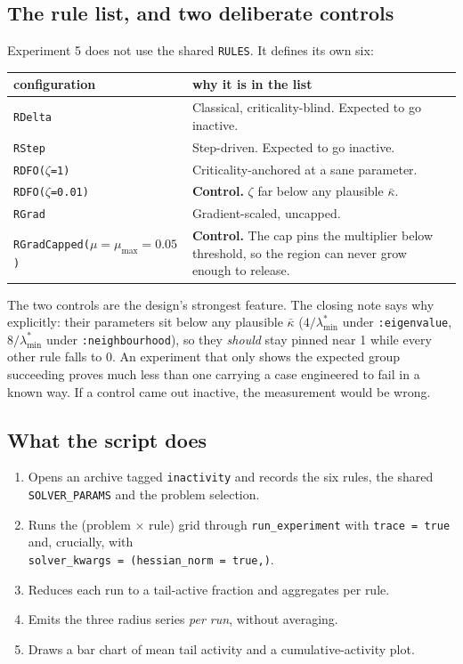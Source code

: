 \documentclass[11pt,a4paper]{article}
\newcommand{\jl}[1]{\texttt{\small #1}}
\begin{document}
\subsection{The rule list, and two deliberate controls}

Experiment 5 does not use the shared \jl{RULES}. It defines its own six:

\begin{longtable}{@{}p{34mm}p{112mm}@{}}
\toprule
\textbf{configuration} & \textbf{why it is in the list} \\
\midrule
\endhead
\jl{RDelta} & Classical, criticality-blind. Expected to go inactive. \\[2pt]
\jl{RStep} & Step-driven. Expected to go inactive. \\[2pt]
\jl{RDFO($\zeta$=1)} & Criticality-anchored at a sane parameter. \\[2pt]
\jl{RDFO($\zeta$=0.01)} & \textbf{Control.} $\zeta$ far below any plausible
$\bar\kappa$. \\[2pt]
\jl{RGrad} & Gradient-scaled, uncapped. \\[2pt]
\jl{RGradCapped($\mu = \mu_{\max} = 0.05$)} & \textbf{Control.} The cap pins the
multiplier below threshold, so the region can never grow enough to release. \\
\bottomrule
\end{longtable}

The two controls are the design's strongest feature. The closing note says why
explicitly: their parameters sit below any plausible
$\bar\kappa$ ($4/\lambda^*_{\min}$ under \jl{:eigenvalue}, $8/\lambda^*_{\min}$
under \jl{:neighbourhood}), so they \emph{should} stay pinned near 1 while every
other rule falls to 0. An experiment that only shows the expected group succeeding
proves much less than one carrying a case engineered to fail in a known way. If a
control came out inactive, the measurement would be wrong.

\subsection{What the script does}

\begin{enumerate}[leftmargin=7mm,itemsep=3pt]
  \item Opens an archive tagged \jl{inactivity} and records the six rules, the
        shared \jl{SOLVER\_PARAMS} and the problem selection.
  \item Runs the (problem $\times$ rule) grid through \jl{run\_experiment} with
        \jl{trace = true} and, crucially, with\\
        \jl{solver\_kwargs = (hessian\_norm = true,)}.
  \item Reduces each run to a tail-active fraction and aggregates per rule.
  \item Emits the three radius series \emph{per run}, without averaging.
  \item Draws a bar chart of mean tail activity and a cumulative-activity plot.
\end{enumerate}
\end{document}
